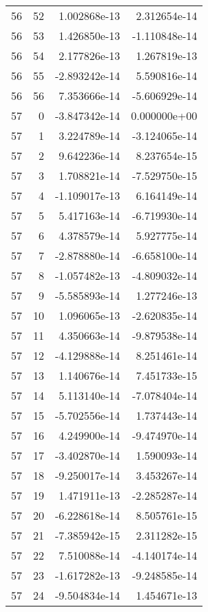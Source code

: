 \begin{tabular}{rrrr}
  56 &   52 &  1.002868e-13 &  2.312654e-14 \\
  56 &   53 &  1.426850e-13 & -1.110848e-14 \\
  56 &   54 &  2.177826e-13 &  1.267819e-13 \\
  56 &   55 & -2.893242e-14 &  5.590816e-14 \\
  56 &   56 &  7.353666e-14 & -5.606929e-14 \\
  57 &    0 & -3.847342e-14 &  0.000000e+00 \\
  57 &    1 &  3.224789e-14 & -3.124065e-14 \\
  57 &    2 &  9.642236e-14 &  8.237654e-15 \\
  57 &    3 &  1.708821e-14 & -7.529750e-15 \\
  57 &    4 & -1.109017e-13 &  6.164149e-14 \\
  57 &    5 &  5.417163e-14 & -6.719930e-14 \\
  57 &    6 &  4.378579e-14 &  5.927775e-14 \\
  57 &    7 & -2.878880e-14 & -6.658100e-14 \\
  57 &    8 & -1.057482e-13 & -4.809032e-14 \\
  57 &    9 & -5.585893e-14 &  1.277246e-13 \\
  57 &   10 &  1.096065e-13 & -2.620835e-14 \\
  57 &   11 &  4.350663e-14 & -9.879538e-14 \\
  57 &   12 & -4.129888e-14 &  8.251461e-14 \\
  57 &   13 &  1.140676e-14 &  7.451733e-15 \\
  57 &   14 &  5.113140e-14 & -7.078404e-14 \\
  57 &   15 & -5.702556e-14 &  1.737443e-14 \\
  57 &   16 &  4.249900e-14 & -9.474970e-14 \\
  57 &   17 & -3.402870e-14 &  1.590093e-14 \\
  57 &   18 & -9.250017e-14 &  3.453267e-14 \\
  57 &   19 &  1.471911e-13 & -2.285287e-14 \\
  57 &   20 & -6.228618e-14 &  8.505761e-15 \\
  57 &   21 & -7.385942e-15 &  2.311282e-15 \\
  57 &   22 &  7.510088e-14 & -4.140174e-14 \\
  57 &   23 & -1.617282e-13 & -9.248585e-14 \\
  57 &   24 & -9.504834e-14 &  1.454671e-13 \\

\end{tabular}
